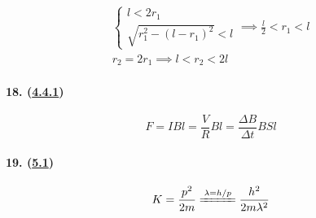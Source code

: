 \begin{gather*}
    \begin{cases}
        l<2r_1\\
        \sqrt{r_1^2-(l-r_1)^2}<l
    \end{cases}\implies
    \frac{l}{2}<r_1<l\\
    r_2=2r_1\implies
    l<r_2<2l
\end{gather*}

\paragraph{18. (\hyperref[subsec:4.4.1]{4.4.1})}

\begin{equation*}
    F=IBl=\frac{V}{R}Bl=\frac{\Delta B}{\Delta t}BSl
\end{equation*}

\paragraph{19. (\hyperref[sec:5.1]{5.1})}

\begin{equation*}
    K=\frac{p^2}{2m}\xlongequal{\lambda=h/p}\frac{h^2}{2m\lambda^2}
\end{equation*}
